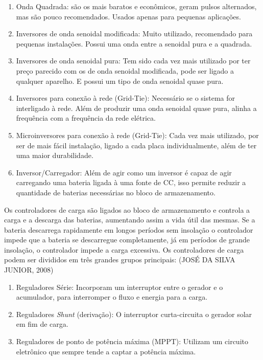\begin{enumerate}
\item Onda Quadrada: são os mais baratos e econômicos, geram pulsos alternados, mas são pouco recomendados. Usados apenas para pequenas aplicações.
\item Inversores de onda senoidal modificada: Muito utilizado, recomendado para pequenas instalações. Possui uma onda entre a senoidal pura e a quadrada.
\item Inversores de onda senoidal pura: Tem sido cada vez mais utilizado por ter preço parecido com os de onda senoidal modificada, pode ser ligado a qualquer aparelho. E possui um tipo de onda senoidal quase pura.
\item Inversores para conexão à rede (Grid-Tie): Necessário se o sistema for interligado à rede. Além de produzir uma onda senoidal quase pura, alinha a frequência com a frequência da rede elétrica.
\item Microinversores para conexão à rede (Grid-Tie): Cada vez mais utilizado, por ser de mais fácil instalação, ligado a cada placa individualmente, além de ter uma maior durabilidade.
\item Inversor/Carregador: Além de agir como um inversor é capaz de agir carregando uma bateria ligada à uma fonte de CC, isso permite reduzir a quantidade de baterias necessárias no bloco de armazenamento.
\end{enumerate}

Os controladores de carga são ligados ao bloco de armazenamento e controla a carga e a descarga das baterias, aumentando assim a vida útil das mesmas. Se a bateria descarrega rapidamente em longos períodos sem insolação o controlador impede que a bateria se descarregue completamente, já em períodos de grande insolação, o controlador impede a carga excessiva. Os controladores de carga podem ser divididos em três grandes grupos principais: (JOSÉ DA SILVA JUNIOR, 2008)

\begin{enumerate}
\item Reguladores Série: Incorporam um interruptor entre o gerador e o acumulador, para interromper o fluxo e energia para a carga.
\item Reguladores \textit{Shunt} (derivação): O interruptor curta-circuita o gerador solar em fim de carga.
\item Reguladores de ponto de potência máxima (MPPT): Utilizam um circuito eletrônico que sempre tende a captar a potência máxima.
\end{enumerate}

